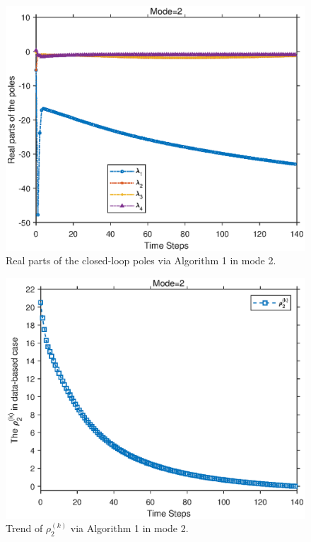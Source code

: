 \documentclass[journal]{IEEEtran}
\begin{document}
\begin{figure} %
	\centering
	\includegraphics[scale=0.6]{mode2_eig.eps}
	\caption{Real parts of the closed-loop poles  via Algorithm 1 in mode 2.}
	\label{fig:3}
	\end{figure}
	
	
\begin{figure} %
    \centering
    \includegraphics[scale=0.6]{rho2.eps}
	\caption{Trend of $\rho^{(k)} _{2 }$ via Algorithm 1 in mode 2.}
	\label{fig:4}
\end{figure}	
\end{document}
